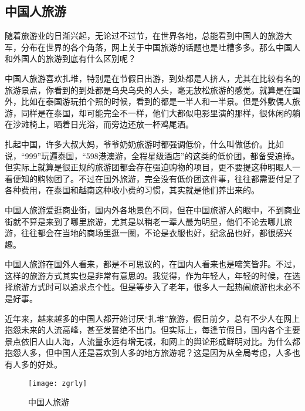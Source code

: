 \subsection{中国人旅游}

随着旅游业的日渐兴起，无论过不过节，在世界各地，总能看到中国人的旅游大军，分布在世界的各个角落，网上关于中国旅游的话题也是吐槽多多。那么中国人和外国人的旅游到底有什么区别呢？

中国人旅游喜欢扎堆，特别是在节假日出游，到处都是人挤人，尤其在比较有名的旅游景点，你看到的到处都是乌央乌央的人头，毫无放松旅游的感觉。就算是在国外，比如在泰国游玩拍个照的时候，看到的都是一半人和一半景。但是外敷偶人旅游，同样是在泰国，却可能完全不一样，他们大都似电影里演的那样，很休闲的躺在沙滩椅上，晒着日光浴，而旁边还放一杯鸡尾酒。

扎起中国，许多大叔大妈，爷爷奶奶旅游时都强调低价，什么叫做低价。比如说，“999”玩遍泰国，“598港澳游，全程星级酒店”的这类的低价团，都备受追捧。但实际上就算是很正规的旅游团都会存在强迫购物的项目，更不要提这种明眼人一看便知的购物团了。不过在国外旅游，完全没有低价团这件事，往往都需要付足了各种费用，在泰国和越南这种收小费的习惯，其实就是他们养出来的。

中国人旅游爱逛商业街，国内外各地景色不同，但在中国旅游人的眼中，不到商业街就不算是来到了哪里旅游，尤其是以稍老一辈人最为明显，他们不论去哪儿旅游，往往都会在当地的商场里逛一圈，不论是衣服也好，纪念品也好，都很感兴趣。

中国人旅游在国外人看来，都是不可思议的，在国内人看来也是啼笑皆非。不过，这样的旅游方式其实也是非常有意思的。我觉得，作为年轻人，年轻的时候，在选择旅游方式时可以追求点个性。但是等步入了老年，很多人一起热闹旅游也未必不是好事。

近年来，越来越多的中国人都开始讨厌“扎堆”旅游，假日前夕，总有不少人在网上抱怨未来的人流高峰，甚至发誓绝不出门。但实际上，每逢节假日，国内各个主要景点依旧人山人海，人流量永远有增无减，和网上的舆论形成鲜明对比。为什么都抱怨人多，但中国人还是喜欢到人多的地方旅游呢？这是因为从全局考虑，人多也有人多的好处。
\begin{figure}[htb]
    \centering
    \texttt{[image: zgrly]}
    \caption{中国人旅游}
\end{figure}





